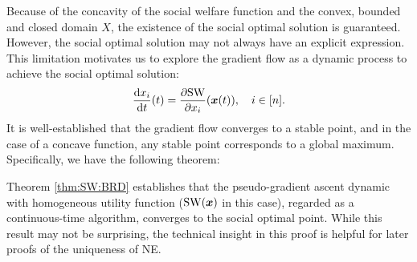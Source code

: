 Because of the concavity of the social welfare function and the convex, bounded and closed domain $X$, the existence of the social optimal solution is guaranteed.
However, the social optimal solution may not always have an explicit expression. This limitation motivates us to explore the gradient flow as a dynamic process to achieve the social optimal solution: 
\begin{equation}
\label{eq:SW:BRD}
    \frac{\mathrm{d} x_i}{\mathrm{d} t}(t) = \frac{\partial \mathrm{SW}}{\partial x_i}({\bm{x}}(t)),\quad {i\in[n]}.
\end{equation}
It is well-established that the gradient flow converges to a stable point, and in the case of a concave function, any stable point corresponds to a global maximum. Specifically, we have the following theorem:


Theorem \ref{thm:SW:BRD} establishes that the pseudo-gradient ascent dynamic with homogeneous utility function ($\mathrm{SW}({\bm{x}})$ in this case), regarded as a continuous-time algorithm, converges to the social optimal point. 
While this result may not be surprising, the technical insight in this proof is helpful for later proofs of the uniqueness of NE.

